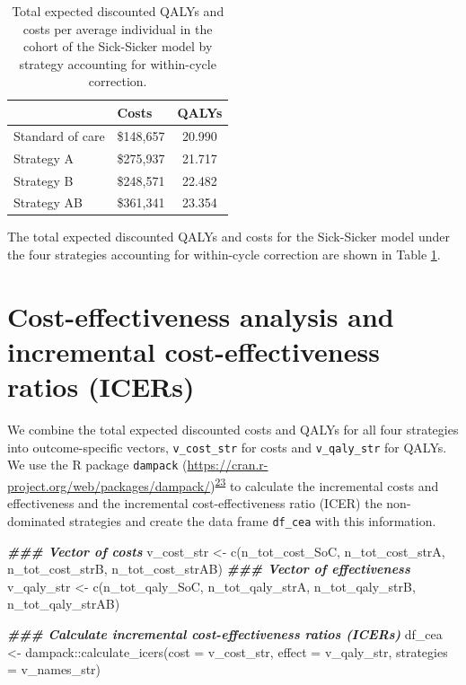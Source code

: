 \documentclass[
]{article}
\newenvironment{Shaded}{\begin{snugshade}}{\end{snugshade}}
\newcommand{\AttributeTok}[1]{\textcolor[rgb]{0.77,0.63,0.00}{#1}}
\newcommand{\DocumentationTok}[1]{\textcolor[rgb]{0.56,0.35,0.01}{\textbf{\textit{#1}}}}
\newcommand{\FunctionTok}[1]{\textcolor[rgb]{0.00,0.00,0.00}{#1}}
\newcommand{\NormalTok}[1]{#1}
\newcommand{\OtherTok}[1]{\textcolor[rgb]{0.56,0.35,0.01}{#1}}
\newcommand{\SpecialCharTok}[1]{\textcolor[rgb]{0.00,0.00,0.00}{#1}}
\begin{document}
\begin{table}[!h]

\caption{\label{tab:Expected-outcomes-table}Total expected discounted QALYs and costs per average individual in the cohort of the Sick-Sicker model by strategy accounting for within-cycle correction.}
\centering
\begin{tabular}[t]{llc}
\toprule
  & Costs & QALYs\\
\midrule
Standard of care & \$148,657 & 20.990\\
Strategy A & \$275,937 & 21.717\\
Strategy B & \$248,571 & 22.482\\
Strategy AB & \$361,341 & 23.354\\
\bottomrule
\end{tabular}
\end{table}

The total expected discounted QALYs and costs for the Sick-Sicker model under the four strategies accounting for within-cycle correction are shown in Table \ref{tab:Expected-outcomes-table}.

\hypertarget{cost-effectiveness-analysis-and-incremental-cost-effectiveness-ratios-icers}{%
\section{Cost-effectiveness analysis and incremental cost-effectiveness ratios (ICERs)}\label{cost-effectiveness-analysis-and-incremental-cost-effectiveness-ratios-icers}}

We combine the total expected discounted costs and QALYs for all four strategies into outcome-specific vectors, \texttt{v\_cost\_str} for costs and \texttt{v\_qaly\_str} for QALYs. We use the R package \texttt{dampack} (\url{https://cran.r-project.org/web/packages/dampack/})\textsuperscript{\protect\hyperlink{ref-Alarid-Escudero2021}{23}} to calculate the incremental costs and effectiveness and the incremental cost-effectiveness ratio (ICER) the non-dominated strategies and create the data frame \texttt{df\_cea} with this information.

\begin{Shaded}
\begin{Highlighting}[]
\DocumentationTok{\#\#\# Vector of costs}
\NormalTok{v\_cost\_str }\OtherTok{\textless{}{-}} \FunctionTok{c}\NormalTok{(n\_tot\_cost\_SoC, n\_tot\_cost\_strA, n\_tot\_cost\_strB, n\_tot\_cost\_strAB)}
\DocumentationTok{\#\#\# Vector of effectiveness}
\NormalTok{v\_qaly\_str }\OtherTok{\textless{}{-}} \FunctionTok{c}\NormalTok{(n\_tot\_qaly\_SoC, n\_tot\_qaly\_strA, n\_tot\_qaly\_strB, n\_tot\_qaly\_strAB)}

\DocumentationTok{\#\#\# Calculate incremental cost{-}effectiveness ratios (ICERs)}
\NormalTok{df\_cea }\OtherTok{\textless{}{-}}\NormalTok{ dampack}\SpecialCharTok{::}\FunctionTok{calculate\_icers}\NormalTok{(}\AttributeTok{cost =}\NormalTok{ v\_cost\_str, }
                                   \AttributeTok{effect =}\NormalTok{ v\_qaly\_str,}
                                   \AttributeTok{strategies =}\NormalTok{ v\_names\_str)}
\end{Highlighting}
\end{Shaded}
\end{document}

